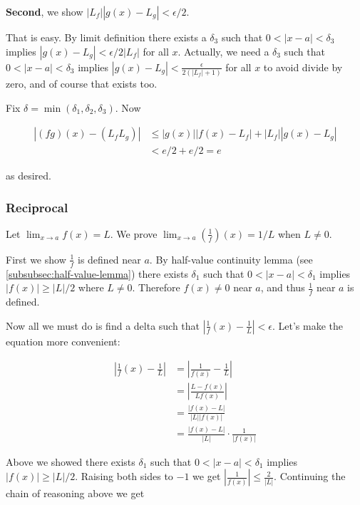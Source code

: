 \vs

\textbf{Second}, we show $|L_f||g(x)-L_g|<\epsilon/2$.

\vs

That is easy. By limit definition there exists a $\delta_3$ such that
$0<|x-a|<\delta_3$ implies $|g(x)-L_g|<\epsilon/2|L_f|$ for all $x$. Actually, we
need a $\delta_3$ such that $0<|x-a|<\delta_3$ implies
$|g(x)-L_g|<\frac{\epsilon}{2(|L_f|+1)}$ for all $x$ to avoid divide by zero, and of
course that exists too.

\vs

Fix $\delta=\min(\delta_1, \delta_2, \delta_3)$. Now

\begin{align*}
    |(fg)(x)-(L_fL_g)|&\leq |g(x)||f(x)-L_f|+|L_f||g(x)-L_g|\\
    &<e/2+e/2=e
\end{align*}

as desired.

\subsubsection*{Reciprocal}

Let $\lim_{x\to a}f(x)=L$. We prove $\lim_{x\to a}\left(\frac{1}{f}\right)(x)=1/L$ when $L\neq 0$.

\vs

First we show $\frac{1}{f}$ is defined near $a$. By half-value
continuity lemma (see \ref{subsubsec:half-value-lemma}) there exists
$\delta_{1}$ such that $0<|x-a|<\delta_{1}$ implies $|f(x)|\geq |L|/2$ where
$L\neq0$. Therefore $f(x)\neq 0$ near $a$, and thus $\frac{1}{f}$ near
$a$ is defined.

\vs


Now all we must do is find a delta such that
$\left|\frac{1}{f}(x)-\frac{1}{L}\right|<\epsilon$. Let's make the equation
more convenient:

\begin{align*}
  \left|\frac{1}{f}(x)-\frac{1}{L}\right|&=\left|\frac{1}{f(x)}-\frac{1}{L}\right|\\
                                         &=\left|\frac{L-f(x)}{Lf(x)}\right|\\
                                         &=\frac{|f(x)-L|}{|L||f(x)|}\\
                                         &=\frac{|f(x)-L|}{|L|}\cdot\frac{1}{|f(x)|}
\end{align*}

Above we showed there exists $\delta_{1}$ such that
$0<|x-a|<\delta_{1}$ implies $|f(x)|\geq |L|/2$. Raising both sides to
$-1$ we get $|\frac{1}{f(x)}|\leq \frac{2}{|L|}$. Continuing the chain of
reasoning above we get

